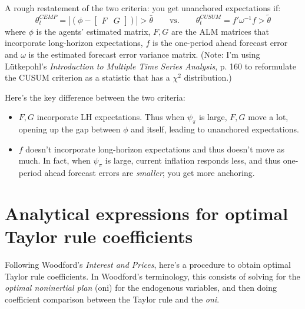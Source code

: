 \documentclass[11pt]{article}
\renewcommand{\[}{\begin{equation}}
\renewcommand{\]}{\end{equation}}
\begin{document}
A rough restatement of the two criteria: you get unanchored expectations if:
\begin{equation}
\theta_t^{CEMP} = | ( \phi - \begin{bmatrix} F & G \end{bmatrix}) | > \bar{\theta} \quad \quad \text{vs.} \quad \quad  \theta_t^{CUSUM} = f' \omega^{-1}f > \tilde{\theta}
\end{equation}
where $\phi$ is the agents' estimated matrix, $F,G$ are the ALM matrices that incorporate long-horizon expectations, $f$ is the one-period ahead forecast error and $\omega$ is the estimated forecast error variance matrix. (Note: I'm using L\"utkepohl's \emph{Introduction to Multiple Time Series Analysis}, p. 160 to reformulate the CUSUM criterion as a statistic that has a $\chi^2$ distribution.)

Here's the key difference between the two criteria:
\begin{itemize}
\item $F,G$ incorporate LH expectations. Thus when $\psi_{\pi}$ is large, $F,G$ move a lot, opening up the gap between $\phi$ and itself, leading to unanchored expectations.
\item $f$ doesn't incorporate long-horizon expectations and thus doesn't move as much. In fact, when $\psi_{\pi}$ is large, current inflation responds less, and thus one-period ahead forecast errors are \emph{smaller}; you get more anchoring. 
\end{itemize}

\newpage
\section{Analytical expressions for optimal Taylor rule coefficients}
Following Woodford's \emph{Interest and Prices}, here's a procedure to obtain optimal Taylor rule coefficients. In Woodford's terminology, this consists of solving for the \emph{optimal noninertial plan} (oni) for the endogenous variables,  and then doing coefficient comparison between the Taylor rule and the \emph{oni}.
\end{document}
